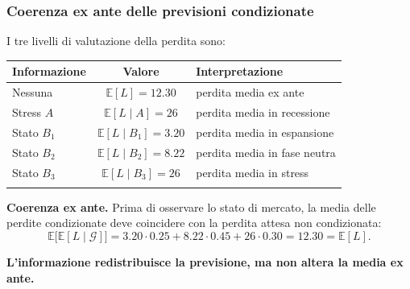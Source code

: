 \documentclass[handout]{beamer}%
\providecommand{\E}{\mathbb{E}}
\providecommand{\G}{\mathcal{G}}
\providecommand{\1}{\mathbf{1}}
\providecommand{\QTR}[2]{\csname #1\endcsname{#2}}
\begin{document}
\begin{frame}%
%

\frametitle{Coerenza ex ante delle previsioni condizionate}%
%

%


I tre livelli di valutazione della perdita sono:

\medskip

\begin{center}%
\begin{tabular}
[c]{l|c|l}%
Informazione & Valore & Interpretazione\\\hline
Nessuna & $\E[L] = 12.30$ & perdita media ex ante\\
Stress $A$ & $\E[L\mid A] = 26$ & perdita media in recessione\\
Stato $B_{1}$ & $\E[L\mid B_1] = 3.20$ & perdita media in espansione\\
Stato $B_{2}$ & $\E[L\mid B_2] = 8.22$ & perdita media in fase neutra\\
Stato $B_{3}$ & $\E[L\mid B_3] = 26$ & perdita media in stress\\
&  &
\end{tabular}

\end{center}

\medskip

\textbf{Coerenza ex ante.} Prima di osservare lo stato di mercato, la media
delle perdite condizionate deve coincidere con la perdita attesa non
condizionata:
\[
\E\bigl[\E[L\mid\G]\bigr] = 3.20\cdot0.25 + 8.22\cdot0.45 + 26\cdot0.30 =
12.30 = \E[L].
\]


\textbf{L'informazione redistribuisce la previsione, ma non altera la media ex
ante.}%

\transboxout
\end{frame}%


\end{document}
